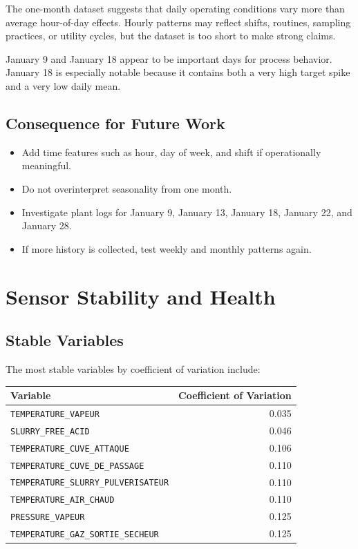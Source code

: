\documentclass[11pt,a4paper]{article}
\begin{document}
The one-month dataset suggests that daily operating conditions vary more than average hour-of-day effects. Hourly patterns may reflect shifts, routines, sampling practices, or utility cycles, but the dataset is too short to make strong claims.

January 9 and January 18 appear to be important days for process behavior. January 18 is especially notable because it contains both a very high target spike and a very low daily mean.

\subsection{Consequence for Future Work}

\begin{itemize}
    \item Add time features such as hour, day of week, and shift if operationally meaningful.
    \item Do not overinterpret seasonality from one month.
    \item Investigate plant logs for January 9, January 13, January 18, January 22, and January 28.
    \item If more history is collected, test weekly and monthly patterns again.
\end{itemize}

\section{Sensor Stability and Health}

\subsection{Stable Variables}

The most stable variables by coefficient of variation include:

\begin{longtable}{p{8cm}r}
\toprule
Variable & Coefficient of Variation \\
\midrule
\texttt{TEMPERATURE\_VAPEUR} & 0.035 \\
\texttt{SLURRY\_FREE\_ACID} & 0.046 \\
\texttt{TEMPERATURE\_CUVE\_ATTAQUE} & 0.106 \\
\texttt{TEMPERATURE\_CUVE\_DE\_PASSAGE} & 0.110 \\
\texttt{TEMPERATURE\_SLURRY\_PULVERISATEUR} & 0.110 \\
\texttt{TEMPERATURE\_AIR\_CHAUD} & 0.110 \\
\texttt{PRESSURE\_VAPEUR} & 0.125 \\
\texttt{TEMPERATURE\_GAZ\_SORTIE\_SECHEUR} & 0.125 \\
\bottomrule
\end{longtable}
\end{document}
